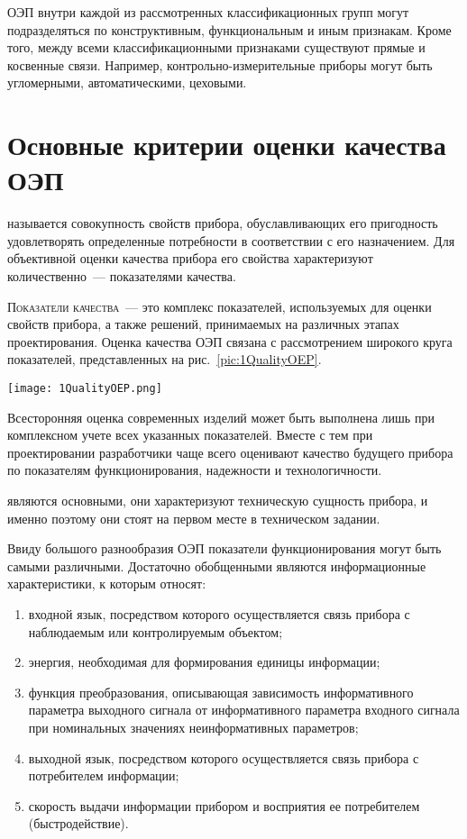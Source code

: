 ОЭП внутри каждой из рассмотренных классификационных групп могут подразделяться по конструктивным, функциональным и иным признакам. Кроме того, между всеми классификационными признаками существуют прямые и косвенные связи. Например, контрольно-измерительные приборы могут быть угломерными, автоматическими, цеховыми.

\section{Основные критерии оценки качества ОЭП}

 называется совокупность свойств прибора, обуславливающих его пригодность удовлетворять определенные потребности в соответствии с его назначением. Для объективной оценки качества прибора его свойства характеризуют количественно~--- показателями качества.

\noindent
\textsc{Показатели качества}~--- это комплекс показателей, используемых для оценки свойств прибора, а также решений, принимаемых на различных этапах проектирования. 
Оценка качества ОЭП связана с рассмотрением широкого круга показателей, представленных на рис.~\ref{pic:1QualityOEP}.

\begin{figure*}[h]
	\texttt{[image: 1QualityOEP.png]}
	\caption{Схема оценки качества ОЭП}
	\label{pic:1QualityOEP}
\end{figure*}

Всесторонняя оценка современных изделий может быть выполнена лишь при комплексном учете всех указанных показателей. Вместе с тем при проектировании разработчики чаще всего оценивают качество будущего прибора по показателям функционирования, надежности и технологичности.

 являются основными, они характеризуют техническую сущность прибора, и именно поэтому они стоят на первом месте в техническом задании.

Ввиду большого разнообразия ОЭП показатели функционирования могут быть самыми различными. Достаточно обобщенными являются информационные характеристики, к которым относят:
\begin{enumerate}
	\item входной язык, посредством которого осуществляется связь прибора с наблюдаемым или контролируемым объектом;
	\item энергия, необходимая для формирования единицы информации;
	\item функция преобразования, описывающая зависимость информативного параметра выходного сигнала от информативного параметра входного сигнала при номинальных значениях неинформативных параметров;
	\item выходной язык, посредством которого осуществляется связь прибора с потребителем информации;
	\item скорость выдачи информации прибором и восприятия ее потребителем (быстродействие).
\end{enumerate}

